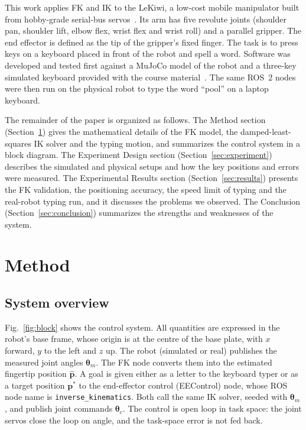 \documentclass[conference]{IEEEtran}
\newcommand{\vect}[1]{\boldsymbol{#1}}
\begin{document}
This work applies FK and IK to the LeKiwi, a low-cost mobile manipulator built from hobby-grade serial-bus servos~\cite{lerobot}. Its arm has five revolute joints (shoulder pan, shoulder lift, elbow flex, wrist flex and wrist roll) and a parallel gripper. The end effector is defined as the tip of the gripper's fixed finger. The task is to press keys on a keyboard placed in front of the robot and spell a word. Software was developed and tested first against a MuJoCo model of the robot and a three-key simulated keyboard provided with the course material~\cite{for26}. The same ROS~2 nodes~\cite{ros2docs} were then run on the physical robot to type the word ``pool'' on a laptop keyboard.

The remainder of the paper is organized as follows. The Method section (Section~\ref{sec:method}) gives the mathematical details of the FK model, the damped-least-squares IK solver and the typing motion, and summarizes the control system in a block diagram. The Experiment Design section (Section~\ref{sec:experiment}) describes the simulated and physical setups and how the key positions and errors were measured. The Experimental Results section (Section~\ref{sec:results}) presents the FK validation, the positioning accuracy, the speed limit of typing and the real-robot typing run, and it discusses the problems we observed. The Conclusion (Section~\ref{sec:conclusion}) summarizes the strengths and weaknesses of the system.

\section{Method}
\label{sec:method}

\subsection{System overview}
Fig.~\ref{fig:block} shows the control system. All quantities are expressed in the robot's base frame, whose origin is at the centre of the base plate, with $x$ forward, $y$ to the left and $z$ up. The robot (simulated or real) publishes the measured joint angles $\boldsymbol{\theta}_m$. The FK node converts them into the estimated fingertip position $\hat{\vect{p}}$. A goal is given either as a letter to the keyboard typer or as a target position $\vect{p}^*$ to the end-effector control (EEControl) node, whose ROS node name is \texttt{inverse\_kinematics}. Both call the same IK solver, seeded with $\boldsymbol{\theta}_m$, and publish joint commands $\boldsymbol{\theta}_{c}$. The control is open loop in task space: the joint servos close the loop on angle, and the task-space error is not fed back.
\end{document}
